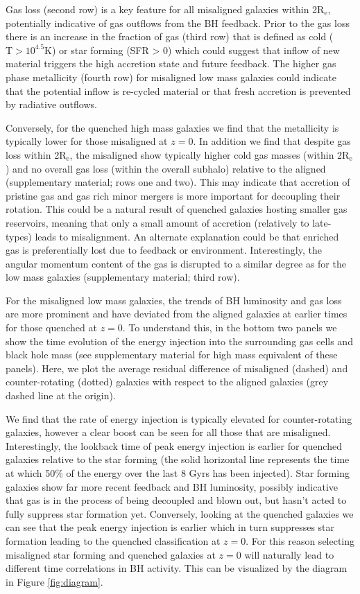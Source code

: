 \documentclass[fleqn,usenatbib]{mnras}
\begin{document}
Gas loss (second row) is a key feature for all misaligned galaxies within 2$\mathrm{R_{e}}$, potentially indicative of gas outflows from the BH feedback. Prior to the gas loss there is an increase in the fraction of gas (third row) that is defined as cold ($\mathrm{T > 10^{4.5}K}$) or star forming (SFR > 0) which could suggest that inflow of new material triggers the high accretion state and future feedback. The higher gas phase metallicity (fourth row) for misaligned low mass galaxies could indicate that the potential inflow is re-cycled material or that fresh accretion is prevented by radiative outflows.

Conversely, for the quenched high mass galaxies we find that the metallicity is typically lower for those misaligned at $z=0$. In addition we find that despite gas loss within 2$\mathrm{R_{e}}$, the misaligned show typically higher cold gas masses (within 2$\mathrm{R_{e}}$) and no overall gas loss (within the overall subhalo) relative to the aligned (supplementary material; rows one and two). This may indicate that accretion of pristine gas and gas rich minor mergers is more important for decoupling their rotation. This could be a natural result of quenched galaxies hosting smaller gas reservoirs, meaning that only a small amount of accretion (relatively to late-types) leads to misalignment. An alternate explanation could be that enriched gas is preferentially lost due to feedback or environment. Interestingly, the angular momentum content of the gas is disrupted to a similar degree as for the low mass galaxies (supplementary material; third row).

For the misaligned low mass galaxies, the trends of BH luminosity and gas loss are more prominent and have deviated from the aligned galaxies at earlier times for those quenched at $z=0$. To understand this, in the bottom two panels we show the time evolution of the energy injection into the surrounding gas cells and black hole mass (see supplementary material for high mass equivalent of these panels). Here, we plot the average residual difference of misaligned (dashed) and counter-rotating (dotted) galaxies with respect to the aligned galaxies (grey dashed line at the origin). 

We find that the rate of energy injection is typically elevated for counter-rotating galaxies, however a clear boost can be seen for all those that are misaligned. Interestingly, the lookback time of peak energy injection is earlier for quenched galaxies relative to the star forming (the solid horizontal line represents the time at which 50\% of the energy over the last 8 Gyrs has been injected). Star forming galaxies show far more recent feedback and BH luminosity, possibly indicative that gas is in the process of being decoupled and blown out, but hasn't acted to fully suppress star formation yet. Conversely, looking at the quenched galaxies we can see that the peak energy injection is earlier which in turn suppresses star formation leading to the quenched classification at $z=0$. For this reason selecting misaligned star forming and quenched galaxies at $z=0$ will naturally lead to different time correlations in BH activity. This can be visualized by the diagram in Figure \ref{fig:diagram}.
\end{document}
